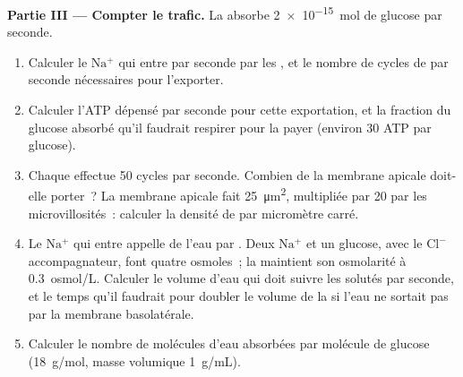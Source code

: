 \begin{problem}
\medskip
\noindent\textbf{Partie III --- Compter le trafic.}
La  absorbe \qty{2e-15}{mol} de glucose par seconde.
\begin{enumerate}[resume]
  \item Calculer le $\mathrm{Na^+}$ qui entre par seconde par les
        , et le nombre de cycles de  par seconde
        nécessaires pour l'exporter.
  \item Calculer l'ATP dépensé par seconde pour cette exportation, et la
        fraction du glucose absorbé qu'il faudrait respirer pour la
        payer (environ 30 ATP par glucose).
  \item Chaque  effectue \qty{50}{} cycles par seconde.
        Combien de  la membrane apicale doit-elle porter~? La
        membrane apicale fait \qty{25}{\micro m^2}, multipliée par
        \qty{20}{} par les microvillosités~: calculer la densité de
         par micromètre carré.
  \item Le $\mathrm{Na^+}$ qui entre appelle de l'eau par . Deux
        $\mathrm{Na^+}$ et un glucose, avec le $\mathrm{Cl^-}$
        accompagnateur, font quatre osmoles~; la  maintient son
        osmolarité à \qty{0.3}{osmol/L}. Calculer le volume d'eau qui
        doit suivre les solutés par seconde, et le temps qu'il faudrait
        pour doubler le volume de la  si l'eau ne sortait pas par
        la membrane basolatérale.
  \item Calculer le nombre de molécules d'eau absorbées par molécule de
        glucose (\qty{18}{g/mol}, masse volumique \qty{1}{g/mL}).
\end{enumerate}


\end{problem}

